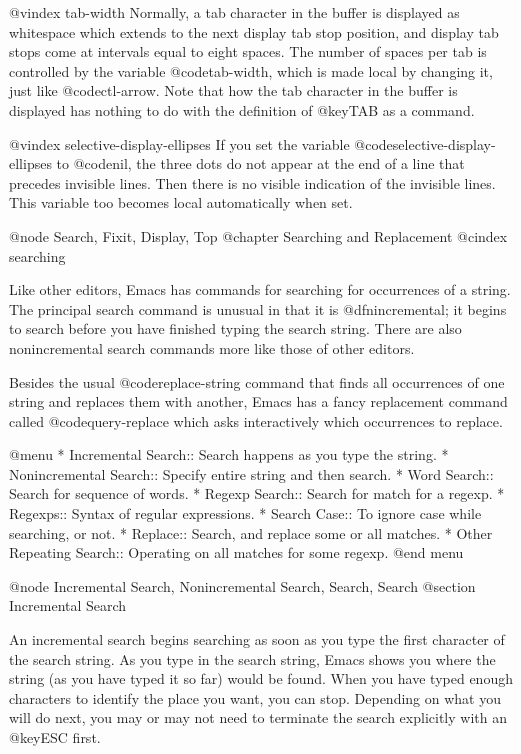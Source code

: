 {{{{{{{{@vindex tab-width
  Normally, a tab character in the buffer is displayed as whitespace which
extends to the next display tab stop position, and display tab stops come
at intervals equal to eight spaces.  The number of spaces per tab is
controlled by the variable @code{tab-width}, which is made local by
changing it, just like @code{ctl-arrow}.  Note that how the tab character
in the buffer is displayed has nothing to do with the definition of
@key{TAB} as a command.

@vindex selective-display-ellipses
  If you set the variable @code{selective-display-ellipses} to @code{nil},
the three dots do not appear at the end of a line that precedes invisible
lines.  Then there is no visible indication of the invisible lines.
This variable too becomes local automatically when set.

@node Search, Fixit, Display, Top
@chapter Searching and Replacement
@cindex searching

  Like other editors, Emacs has commands for searching for occurrences of
a string.  The principal search command is unusual in that it is
@dfn{incremental}; it begins to search before you have finished typing the
search string.  There are also nonincremental search commands more like
those of other editors.

  Besides the usual @code{replace-string} command that finds all
occurrences of one string and replaces them with another, Emacs has a fancy
replacement command called @code{query-replace} which asks interactively
which occurrences to replace.

@menu
* Incremental Search::     Search happens as you type the string.
* Nonincremental Search::  Specify entire string and then search.
* Word Search::            Search for sequence of words.
* Regexp Search::          Search for match for a regexp.
* Regexps::                Syntax of regular expressions.
* Search Case::            To ignore case while searching, or not.
* Replace::                Search, and replace some or all matches.
* Other Repeating Search:: Operating on all matches for some regexp.
@end menu

@node Incremental Search, Nonincremental Search, Search, Search
@section Incremental Search

  An incremental search begins searching as soon as you type the first
character of the search string.  As you type in the search string, Emacs
shows you where the string (as you have typed it so far) would be found.
When you have typed enough characters to identify the place you want, you
can stop.  Depending on what you will do next, you may or may not need to
terminate the search explicitly with an @key{ESC} first.

}}}}}}}}
